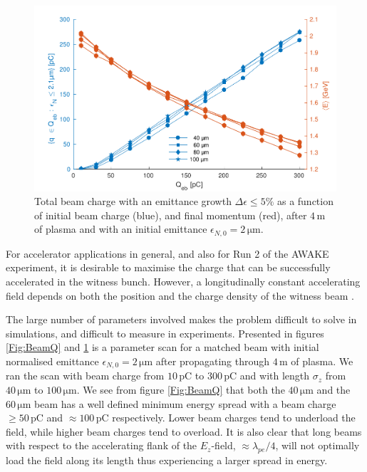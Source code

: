 \documentclass[aps,prstab,reprint,amsmath,amssymb,groupedaddress]{revtex4-1}
\newcommand{\unit}[1]{\,\mathrm{#1}}
\begin{document}
\begin{figure}[hbt]
    \includegraphics[width=\linewidth,trim={2mm 0mm 2mm 0mm},clip]{figures/beamQualityAbs}
    \caption{\label{Fig:BeamQAbs} Total beam charge with an emittance growth $\Delta\epsilon \leq 5\%$ as a function of
        initial beam charge (blue), and final momentum (red), after $4\unit{m}$ of plasma and with an initial emittance
        $\epsilon_{N,0}=2\unit{\mu m}$.}
\end{figure}

For accelerator applications in general, and also for Run 2 of the AWAKE experiment, it is desirable to maximise the
charge that can be successfully accelerated in the witness bunch. However, a longitudinally constant accelerating
field depends on both the position and the charge density of the witness beam \cite{katsouleas:1987, tzoufras:2009}.

The large number of parameters involved makes the problem difficult to solve in simulations, and difficult to measure in
experiments. Presented in figures \ref{Fig:BeamQ} and \ref{Fig:BeamQAbs} is a parameter scan for a matched beam with
initial normalised emittance $\epsilon_{N,0}=2\unit{\mu m}$ after propagating through $4\unit{m}$ of plasma. We ran the
scan with beam charge from $10\unit{pC}$ to $300\unit{pC}$ and with length $\sigma_{z}$ from $40\unit{\mu m}$ to
$100\unit{\mu m}$. We see from figure \ref{Fig:BeamQ} that both the $40\unit{\mu m}$ and the $60\unit{\mu m}$ beam has a
well defined minimum energy spread with a beam charge $\geq 50\unit{pC}$ and $\approx 100\unit{pC}$ respectively. Lower
beam charges tend to underload the field, while higher beam charges tend to overload. It is also clear that long beams
with respect to the accelerating flank of the $E_{z}$-field, $\approx\lambda_{pe}/4$, will not optimally load the field
along its length thus experiencing a larger spread in energy.
\end{document}
